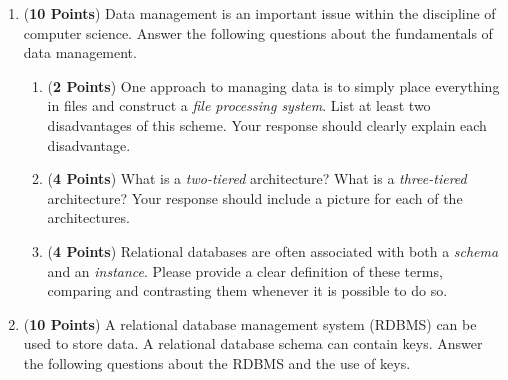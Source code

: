\documentclass[12pt]{article}
\begin{document}
\begin{enumerate}

\item ({\bf 10 Points}) Data management is an important issue within
  the discipline of computer science.  Answer the following questions
  about the fundamentals of data management.

\begin{enumerate}

\item ({\bf 2 Points}) One approach to managing data is to simply
  place everything in files and construct a {\em file processing
    system}.  List at least two disadvantages of this scheme.  Your
  response should clearly explain each disadvantage.


\item ({\bf 4 Points}) What is a {\em two-tiered} architecture?  What
  is a {\em three-tiered} architecture?  Your response should include
  a picture for each of the architectures.



\item ({\bf 4 Points}) Relational databases are often associated with
  both a {\em schema} and an {\em instance}.  Please provide a clear
  definition of these terms, comparing and contrasting them whenever
  it is possible to do so.

\end{enumerate}

\newpage

\item ({\bf 10 Points}) A relational database management system
  (RDBMS) can be used to store data.  A relational database schema
  can contain keys.  Answer the following questions about the 
  RDBMS and the use of keys.


\end{enumerate}
\end{document}
